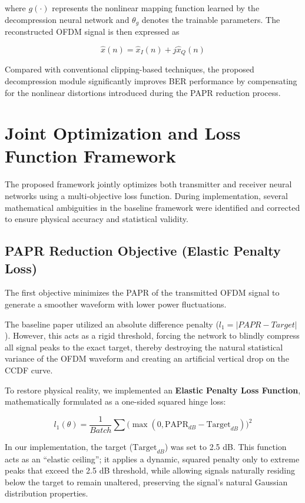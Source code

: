 where $g(\cdot)$ represents the nonlinear mapping function learned by the decompression neural network and $\theta_g$ denotes the trainable parameters. The reconstructed OFDM signal is then expressed as

\begin{equation*}
    \hat{x}(n)=\hat{x}_I(n)+j\hat{x}_Q(n)
\end{equation*}

Compared with conventional clipping-based techniques, the proposed decompression module significantly improves BER performance by compensating for the nonlinear distortions introduced during the PAPR reduction process.

\section{Joint Optimization and Loss Function Framework}

The proposed framework jointly optimizes both transmitter and receiver neural networks using a multi-objective loss function. During implementation, several mathematical ambiguities in the baseline framework \cite{liu2020low} were identified and corrected to ensure physical accuracy and statistical validity.

\subsection{PAPR Reduction Objective (Elastic Penalty Loss)}

The first objective minimizes the PAPR of the transmitted OFDM signal to generate a smoother waveform with lower power fluctuations.

The baseline paper \cite{liu2020low} utilized an absolute difference penalty ($l_1 = |PAPR - Target|$). However, this acts as a rigid threshold, forcing the network to blindly compress all signal peaks to the exact target, thereby destroying the natural statistical variance of the OFDM waveform and creating an artificial vertical drop on the CCDF curve.

To restore physical reality, we implemented an \textbf{Elastic Penalty Loss Function}, mathematically formulated as a one-sided squared hinge loss:

\begin{equation*}
    l_{1}(\theta) = \frac{1}{Batch} \sum \big(\max(0, \mathrm{PAPR}_{dB} - \mathrm{Target}_{dB})\big)^2
\end{equation*}

In our implementation, the target ($\mathrm{Target}_{dB}$) was set to 2.5 dB. This function acts as an ``elastic ceiling''; it applies a dynamic, squared penalty only to extreme peaks that exceed the 2.5 dB threshold, while allowing signals naturally residing below the target to remain unaltered, preserving the signal's natural Gaussian distribution properties.


